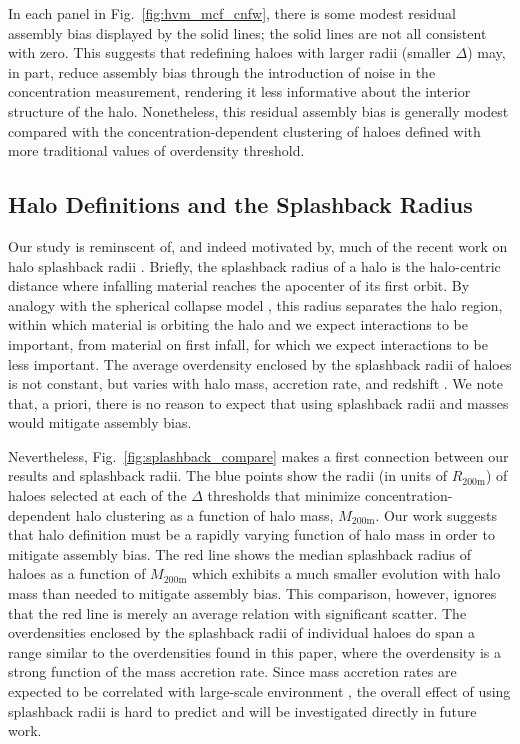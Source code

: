 \documentclass[usenatbib,fleqn]{mnras}
\begin{document}
In each panel in Fig.~\ref{fig:hvm_mcf_cnfw}, there is some modest residual assembly bias displayed by the solid lines; the solid lines are not all consistent with zero. This suggests that redefining haloes with larger radii (smaller $\Delta$) may, in part, reduce assembly bias through the introduction of noise in the concentration measurement, rendering it less informative about the interior structure of the halo. Nonetheless, this residual assembly bias is generally modest compared with the concentration-dependent clustering of haloes defined with more traditional values of overdensity threshold.

\subsection{Halo Definitions and the Splashback Radius}

Our study is reminscent of, and indeed motivated by, much of the recent work on halo splashback radii \citep{more_etal15, mansfield_etal16, diemer_etal17}. Briefly, the splashback radius of a halo is the halo-centric distance where infalling material reaches the apocenter of its first orbit. By analogy with the spherical collapse model \citep[e.g.,][]{fillmore_goldreich84}, this radius separates the halo region, within which material is orbiting the halo and we expect interactions to be important, from material on first infall, for which we expect interactions to be less important. The average overdensity enclosed by the splashback radii of haloes is not constant, but varies with halo mass, accretion rate, and redshift \citep{mansfield_etal16, diemer_etal17}. We note that, a priori, there is no reason to expect that using splashback radii and masses would mitigate assembly bias. 

Nevertheless, Fig.~\ref{fig:splashback_compare} makes a first connection between our results and splashback radii. The blue points show the radii (in units of $R_{200\text{m}}$) of haloes selected at each of the $\Delta$ thresholds that minimize concentration-dependent halo clustering as a function of halo mass, $M_{200\text{m}}$. Our work suggests that halo definition must be a rapidly varying function of halo mass in order to mitigate assembly bias. The red line shows the median splashback radius of haloes as a function of $M_{200\text{m}}$ \citep{diemer_etal17} which exhibits a much smaller evolution with halo mass than needed to mitigate assembly bias. This comparison, however, ignores that the red line is merely an average relation with significant scatter. The overdensities enclosed by the splashback radii of individual haloes do span a range similar to the overdensities found in this paper, where the overdensity is a strong function of the mass accretion rate. Since mass accretion rates are expected to be correlated with large-scale environment \citep[e.g.,][]{hearin_etal16}, the overall effect of using splashback radii is hard to predict and will be investigated directly in future work.
\end{document}
